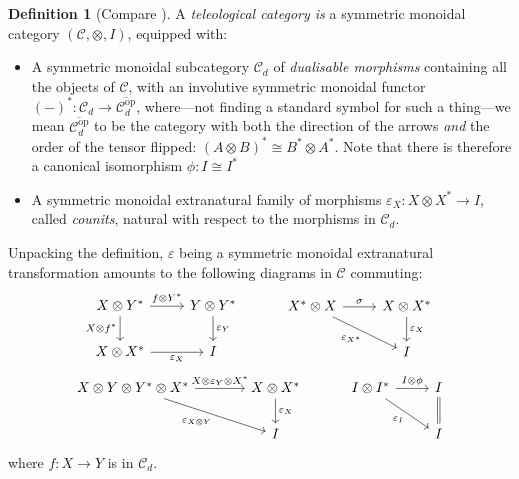 \documentclass[11pt,letterpaper]{article}
\theoremstyle{plain}
\theoremstyle{definition}
\newtheorem{definition}[theorem]{Definition}
\newcommand{\C}{\mathscr{C}}
\newcommand{\op}{\mathrm{op}}
\begin{document}
\begin{definition}[Compare {\cite[Definition 5.1]{CoherenceForLenses}}]
  A \emph{teleological category is} a symmetric monoidal category $(\C, \otimes, I)$, equipped with:
  \begin{itemize}
  \item A symmetric monoidal subcategory $\C_d$ of \emph{dualisable morphisms} containing all the objects of $\C$, with an involutive symmetric monoidal functor ${(-)}^* : \C_d \to \overline{\C_d^\op}$, where---not finding a standard symbol for such a thing---we mean $\overline{\C_d^\op}$ to be the category with both the direction of the arrows \emph{and} the order of the tensor flipped: ${(A \otimes B)}^* \cong B^* \otimes A^*$. Note that there is therefore a canonical isomorphism $\phi : I \cong I^*$
  \item A symmetric monoidal extranatural family of morphisms $\varepsilon_X : X \otimes X^* \to I$, called \emph{counits}, natural with respect to the morphisms in $\C_d$.
  \end{itemize}
\end{definition}
Unpacking the definition, $\varepsilon$ being a symmetric monoidal extranatural transformation amounts to the following diagrams in $\C$ commuting:
\[
  \begin{tikzcd}
    X \otimes Y^* \ar[r, "f \otimes Y^*"]  \ar[d, "X \otimes f^*", swap] & Y \otimes Y^* \ar[d, "\varepsilon_Y"] \\
    X \otimes X^* \ar[r, "\varepsilon_X", swap] & I
  \end{tikzcd} \hspace{1cm}
  \begin{tikzcd}
    X^* \otimes X \ar[r, "\sigma"]  \ar[dr, "\varepsilon_{X^*}", swap] & X \otimes X^* \ar[d, "\varepsilon_X"] \\
    & I
  \end{tikzcd}\]
\[
  \begin{tikzcd}[column sep = large]
    X \otimes Y \otimes Y^* \otimes X^* \ar[r, "X \otimes \varepsilon_Y \otimes X^*"]  \ar[dr, "\varepsilon_{X \otimes Y}", swap] & X \otimes X^* \ar[d, "\varepsilon_X"] \\
    & I
  \end{tikzcd} \hspace{1cm}
  \begin{tikzcd}
    I \otimes I^* \ar[r,"I \otimes \phi"] \ar[dr, swap, "\varepsilon_I"] & I \ar[d, equal] \\
    & I
  \end{tikzcd}
\]
where $f : X \to Y$ is in $\C_d$.
\end{document}
